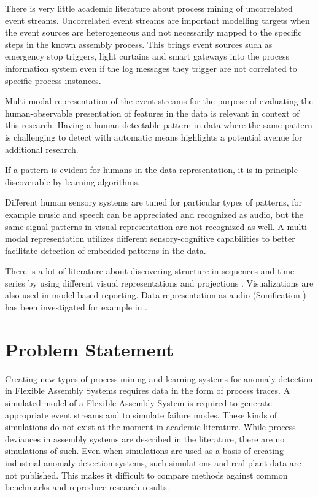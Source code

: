 \documentclass[a4paper,10pt]{article}
\begin{document}
There is very little academic literature about process mining of uncorrelated event streams. Uncorrelated event streams are important modelling targets when the event sources
are heterogeneous and not necessarily mapped to the specific steps in the known assembly process. This brings event sources such as emergency stop triggers, light curtains and
smart gateways into the process information system even if the log messages they trigger are not correlated to specific process instances.

Multi-modal representation of the event streams for the purpose of evaluating the human-observable presentation of features in the data is relevant in context of this research.
Having a human-detectable pattern in data where the same pattern is challenging to
detect with automatic means highlights a potential avenue for additional research.

If a pattern is evident for humans in the data representation, it is in principle discoverable by learning algorithms.

Different human sensory systems are tuned for particular types of patterns, for example music and speech
can be appreciated and recognized as audio, but the same signal patterns in visual representation are not recognized as well.
A multi-modal representation utilizes different sensory-cognitive capabilities to better facilitate detection of embedded patterns in the data.

There is a lot of literature about discovering structure in sequences and time series by using different visual representations and
projections \cite{hein2010recognition,misue2014chronoview}. Visualizations are also used in model-based reporting\cite{schuh2013ieee}.
Data representation as audio (Sonification \cite{refKra}) has been investigated for example in \cite{yeung1980pattern,kaper1999data}.

\section{Problem Statement}

Creating new types of process mining and learning systems for anomaly detection in Flexible Assembly Systems requires data in the form of process traces.
A simulated model of a Flexible Assembly System is required to generate appropriate event streams and to simulate failure modes. These kinds of simulations
do not exist at the moment in academic literature. While process deviances in assembly systems are described in the literature, there are no simulations of such.
Even when simulations are used as a basis of creating industrial anomaly detection systems, such simulations and real plant data are not published\cite{matarese2013procedure}.
This makes it difficult to compare methods against common benchmarks and reproduce research results.
\end{document}

